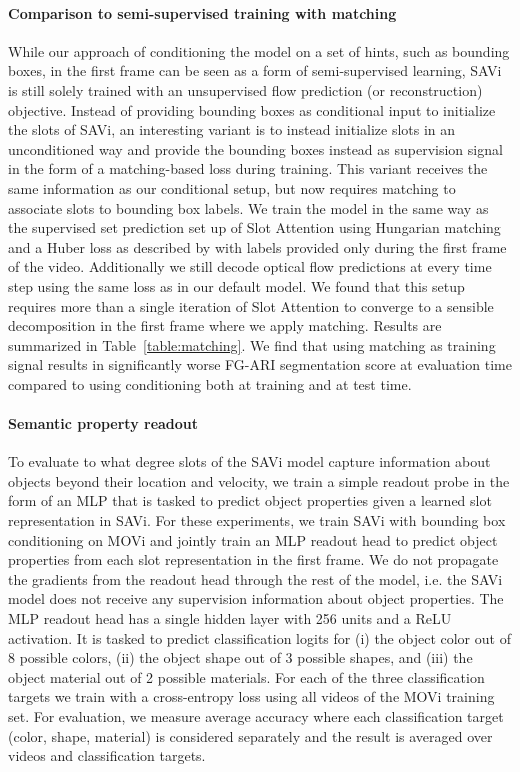 \documentclass{article}
\begin{document}
\paragraph{Comparison to semi-supervised training with matching}
While our approach of conditioning the model on a set of hints, such as bounding boxes, in the first frame can be seen as a form of semi-supervised learning, SAVi is still solely trained with an unsupervised flow prediction (or reconstruction) objective. Instead of providing bounding boxes as conditional input to initialize the slots of SAVi, an interesting variant is to instead initialize slots in an unconditioned way and provide the bounding boxes instead as supervision signal in the form of a matching-based loss during training. This variant receives the same information as our conditional setup, but now requires matching to associate slots to bounding box labels. We train the model in the same way as the supervised set prediction set up of Slot Attention using Hungarian matching and a Huber loss as described by \citet{locatello2020object} with labels provided only during the first frame of the video. Additionally we still decode optical flow predictions at every time step using the same loss as in our default model. We found that this setup requires more than a single iteration of Slot Attention to converge to a sensible decomposition in the first frame where we apply matching. Results are summarized in Table~\ref{table:matching}. We find that using matching as training signal results in significantly worse FG-ARI segmentation score at evaluation time compared to using conditioning both at training and at test time.

\paragraph{Semantic property readout}
To evaluate to what degree slots of the SAVi model capture information about objects beyond their location and velocity, we train a simple readout probe in the form of an MLP that is tasked to predict object properties given a learned slot representation in SAVi. For these experiments, we train SAVi with bounding box conditioning on MOVi and jointly train an MLP readout head to predict object properties from each slot representation in the first frame. We do not propagate the gradients from the readout head through the rest of the model, i.e. the SAVi model does not receive any supervision information about object properties. The MLP readout head has a single hidden layer with 256 units and a ReLU activation. It is tasked to predict classification logits for (i) the object color out of 8 possible colors, (ii) the object shape out of 3 possible shapes, and (iii) the object material out of 2 possible materials. For each of the three classification targets we train with a cross-entropy loss using all videos of the MOVi training set. For evaluation, we measure average accuracy where each classification target (color, shape, material) is considered separately and the result is averaged over videos and classification targets. 
\end{document}
